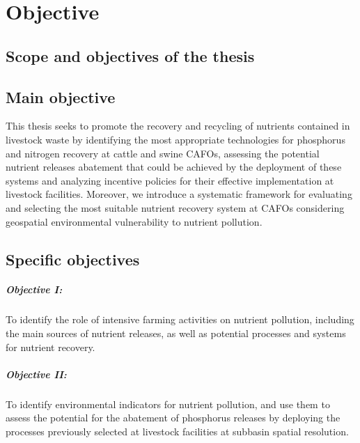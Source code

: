 \chapter{Objective}\label{ch:objectives}

\section{Scope and objectives of the thesis}
\section{Main objective}
This thesis seeks to promote the recovery and recycling of nutrients contained in livestock waste by identifying the most appropriate technologies for phosphorus and nitrogen recovery at cattle and swine CAFOs, assessing the potential nutrient releases abatement that could be achieved by the deployment of these systems and analyzing incentive policies for their effective implementation at livestock facilities. Moreover, we introduce a systematic framework for evaluating and selecting the most suitable nutrient recovery system at CAFOs considering geospatial environmental vulnerability to nutrient pollution. 

\section{Specific objectives}
\paragraph{Objective I:} To
identify the role of intensive farming activities on nutrient pollution, including the main sources of nutrient releases, as well as potential processes and systems for nutrient recovery.
\paragraph{Objective II:} To identify environmental indicators for nutrient pollution, and use  them to  assess the potential for the abatement of phosphorus releases by deploying the processes previously selected at livestock facilities at subbasin spatial resolution.
